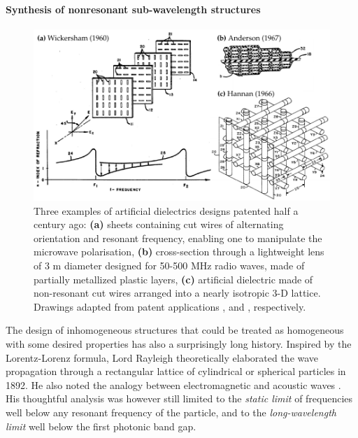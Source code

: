 \paragraph{Synthesis of nonresonant sub-wavelength structures} %
\begin{figure}[h] \caption{Three examples of artificial dielectrics designs patented half a century ago: \textbf{(a)} sheets containing cut wires of alternating orientation and resonant frequency, enabling one to manipulate the microwave polarisation, \textbf{(b)} cross-section through a lightweight lens of 3 m diameter designed for 50-500 MHz radio waves, made of partially metallized plastic layers, \textbf{(c)} artificial dielectric made of non-resonant cut wires arranged into a nearly isotropic 3-D lattice. Drawings adapted from patent applications \cite{wickersham1960artificial},  \cite{anderson1967artificial} and \cite{hannan1966artificial}, respectively.} \label{fg_mm_patents} \centering \includegraphics[width=\textwidth]{img/patents/mm_patents.pdf} \end{figure}

The design of inhomogeneous structures that could be treated as homogeneous with some desired properties has also a surprisingly long history. 
Inspired by the Lorentz-Lorenz formula, Lord Rayleigh theoretically elaborated the wave propagation through a rectangular lattice of cylindrical or spherical particles in 1892. He also noted the analogy between electromagnetic and acoustic waves \cite[p. 498]{rayleigh1892}. His thoughtful analysis was however still limited to the \textit{static limit} of frequencies well below any resonant frequency of the particle, and to the \textit{long-wavelength limit} well below the first photonic band gap. 

